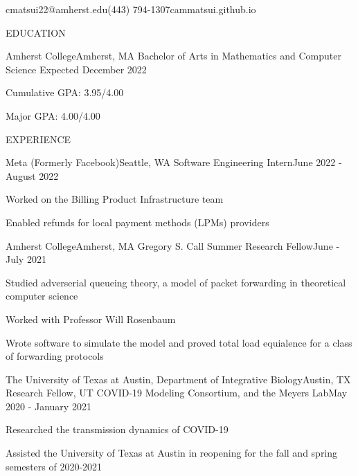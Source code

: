 \documentclass{article}
\begin{document}
\thispagestyle{empty}

        {cmatsui22@amherst.edu}{(443) 794-1307}{cammatsui.github.io}

\begin{bigsection}{EDUCATION}
    \begin{sectionitem}{Amherst College}{Amherst, MA}
            {Bachelor of Arts in Mathematics and Computer Science}
            {Expected December 2022}
        \item Cumulative GPA: 3.95/4.00
        \item Major GPA: 4.00/4.00
    \end{sectionitem}
\end{bigsection}

\begin{bigsection}{EXPERIENCE}
    \begin{sectionitem}{Meta (Formerly Facebook)}{Seattle, WA}
            {Software Engineering Intern}{June 2022 - August 2022}
        \item Worked on the Billing Product Infrastructure team
        \item Enabled refunds for local payment methods (LPMs) providers
    \end{sectionitem}

    \begin{sectionitem}{Amherst College}{Amherst, MA}
            {Gregory S. Call Summer Research Fellow}{June - July 2021}
        \item Studied adverserial queueing theory, a model of packet forwarding in theoretical computer science
        \item Worked with Professor Will Rosenbaum
        \item Wrote software to simulate the model and proved total load equialence for a class of forwarding protocols
    \end{sectionitem}

    \begin{sectionitem}{The University of Texas at Austin, Department of Integrative Biology}{Austin, TX}
            {Research Fellow, UT COVID-19 Modeling Consortium, and the Meyers Lab}{May 2020 - January 2021}
        \item Researched the transmission dynamics of COVID-19
        \item Assisted the University of Texas at Austin in reopening for the fall and spring semesters of 2020-2021
    \end{sectionitem}
\end{bigsection}
\end{document}
